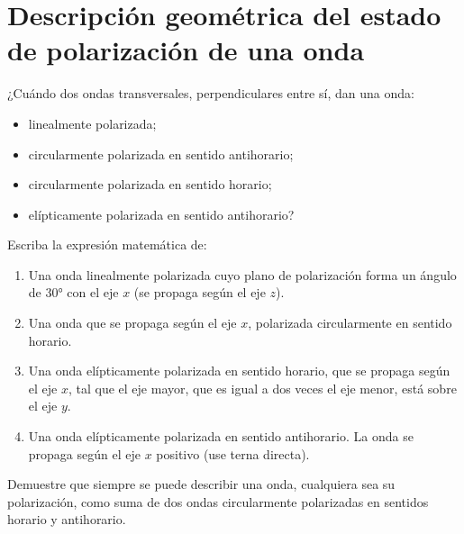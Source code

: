 \section*{Descripción geométrica del estado de polarización de una onda}

\item ¿Cuándo dos ondas transversales, perpendiculares entre sí, dan una onda:
\begin{itemize}
	\item linealmente polarizada;
	\item circularmente polarizada en sentido antihorario;
	\item circularmente polarizada en sentido horario;
	\item elípticamente polarizada en sentido antihorario? 
\end{itemize}



\item Escriba la expresión matemática de:
\begin{enumerate}
	\item Una onda linealmente polarizada cuyo plano de polarización forma un ángulo de \ang{30;;} con el eje $x$ (se propaga según el eje $z$). 
	\item Una onda que se propaga según el eje $x$, polarizada circularmente en sentido horario.
	\item Una onda elípticamente polarizada en sentido horario, que se propaga según el eje $x$, tal que el eje mayor, que es igual a dos veces el eje menor, está sobre el eje $y$.
	\item Una onda elípticamente polarizada en sentido antihorario.
	La onda se propaga según el eje $x$ positivo (use terna directa). 
\end{enumerate}



\item Demuestre que siempre se puede describir una onda, cualquiera sea su polarización, como suma de dos ondas circularmente polarizadas en sentidos horario y antihorario.
